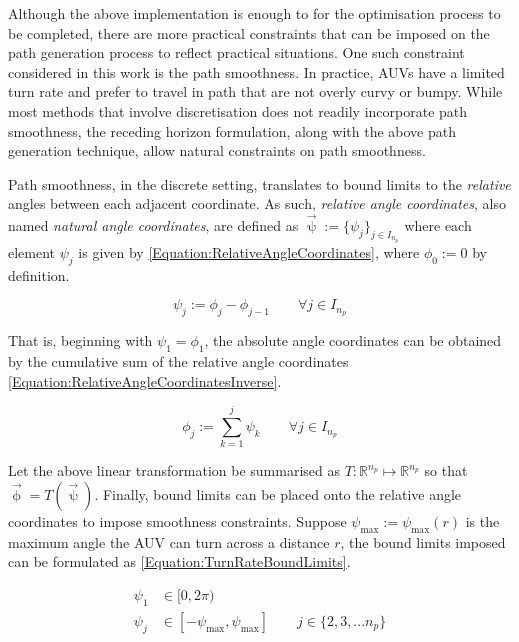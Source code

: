 			Although the above implementation is enough to for the optimisation process to be completed, there are more practical constraints that can be imposed on the path generation process to reflect practical situations. One such constraint considered in this work is the path smoothness. In practice, AUVs have a limited turn rate and prefer to travel in path that are not overly curvy or bumpy. While most methods that involve discretisation does not readily incorporate path smoothness, the receding horizon formulation, along with the above path generation technique, allow natural constraints on path smoothness.
			
			Path smoothness, in the discrete setting, translates to bound limits to the \textit{relative} angles between each adjacent coordinate. As such, \textit{relative angle coordinates}, also named \textit{natural angle coordinates}, are defined as $\vec{\uppsi} := \{\psi_{j}\}_{j \in I_{n_{p}}}$ where each element $\psi_{j}$ is given by \eqref{Equation:RelativeAngleCoordinates}, where $\phi_{0} := 0$ by definition. 
			
			\begin{equation}
				\psi_{j} := \phi_{j} - \phi_{j - 1}	\qquad \forall j \in I_{n_{p}}
			\label{Equation:RelativeAngleCoordinates}
			\end{equation}
			
			That is, beginning with $\psi_{1} = \phi_{1}$, the absolute angle coordinates can be obtained by the cumulative sum of the relative angle coordinates \eqref{Equation:RelativeAngleCoordinatesInverse}.
			
			\begin{equation}
				\phi_{j} := \sum_{k = 1}^{j} \psi_{k} \qquad \forall j \in I_{n_{p}}
			\label{Equation:RelativeAngleCoordinatesInverse}
			\end{equation}
				
			Let the above linear transformation be summarised as $T: \mathbb{R}^{n_{p}} \mapsto \mathbb{R}^{n_{p}}$ so that $\vec{\upphi} = T(\vec{\uppsi})$. Finally, bound limits can be placed onto the relative angle coordinates to impose smoothness constraints. Suppose $\psi_{\mathrm{max}} := \psi_{\mathrm{max}}(r)$ is the maximum angle the AUV can turn across a distance $r$, the bound limits imposed can be formulated as \eqref{Equation:TurnRateBoundLimits}.

			\begin{equation}
				\begin{aligned}
					\psi_{1} & \in [0, 2 \pi) \\
					\psi_{j} & \in [-\psi_{\mathrm{max}}, \psi_{\mathrm{max}}] \qquad j \in \{2, 3, \dots n_{p}\}
				\end{aligned}
			\label{Equation:TurnRateBoundLimits}
			\end{equation}
			
